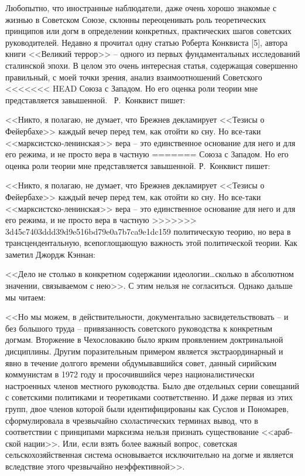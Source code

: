 \documentclass{book}
\begin{document}
Любопытно, что иностранные наблюдатели, даже очень хорошо знакомые с жизнью в Советском Союзе, склонны переоценивать роль 
теоретических принципов или догм в определении конкретных, практических шагов советских руководителей. Недавно я прочитал одну 
статью Роберта Конквиста [5], автора книги <<Великий террор>> -- одного из первых фундаментальных исследований сталинской эпохи. 
В целом это очень интересная статья, содержащая совершенно правильный, с моей точки зрения, анализ взаимоотношений Советского 
<<<<<<< HEAD
Союза с Западом. Но его оценка роли теории мне представляется завышенной.  Р.~Конквист пишет:

<<Никто, я полагаю, не думает, что Брежнев декламирует <<Тезисы о Фейербахе>> каждый вечер перед тем, как отойти ко сну. Но 
все‑таки <<марксистско‑ленинская>> вера -- это единственное основание для него и для его режима, и не просто вера в частную 
=======
Союза с Западом. Но его оценка роли теории мне представляется завышенной. Р.~Конквист пишет:

<<Никто, я полагаю, не думает, что Брежнев декламирует <<Тезисы о Фейербахе>> каждый вечер перед тем, как отойти ко сну. Но 
все-таки <<марксистско-ленинская>> вера -- это единственное основание для него и для его режима, и не просто вера в частную 
>>>>>>> 3d45c7403ddd39d9e516bd79e0a7b7ca9e1dc159
политическую теорию, но вера в трансцендентальную, всепоглощающую важность этой политической теории. Как заметил Джордж Кэннан: 

<<Дело не столько в конкретном содержании идеологии\ldots сколько в абсолютном значении, связываемом с нею>>. С этим нельзя не согласиться. Однако дальше мы читаем:

<<Но мы можем, в действительности, документально засвидетельствовать -- и без большого труда -- привязанность советского руководства к конкретным догмам. Вторжение в Чехословакию было ярким проявлением доктринальной дисциплины. Другим поразительным примером является экстраординарный и явно в течение долгого времени обдумывавшийся совет, данный сирийским коммунистам в 1972 году и просочившийся через националистически настроенных членов мест­ного руководства. Было две отдельных серии совещаний с советскими политиками и теоретиками соответственно. И даже первая из этих групп, двое членов которой были идентифици­рованы как Суслов и Пономарев, сформулировала в чрезвы­чайно схоластических терминах вывод, что в соответствии с принципами марксизма нельзя признать существование <<араб­ской нации>>. Или, если взять более важный вопрос, советская сельскохозяйственная система основывается исключительно на догме и является вследствие этого чрезвычайно неэффектив­ной>>.
\end{document}
